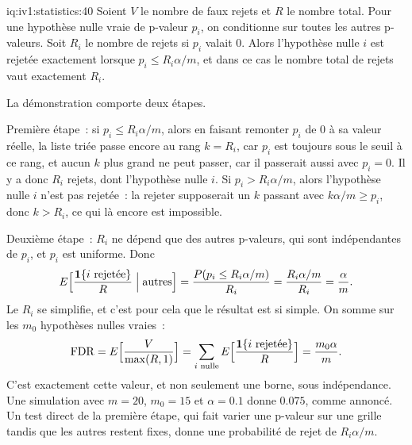 \begin{solution}{iq:iv1:statistics:40}
Soient $V$ le nombre de faux rejets et $R$ le nombre total. Pour une hypothèse nulle vraie de p-valeur $p_i$, on conditionne sur toutes les autres p-valeurs. Soit $R_i$ le nombre de rejets si $p_i$ valait 0. Alors l'hypothèse nulle $i$ est rejetée exactement lorsque $p_i \le R_i\alpha/m$, et dans ce cas le nombre total de rejets vaut exactement $R_i$.

La démonstration comporte deux étapes.

Première étape~: si $p_i \le R_i\alpha/m$, alors en faisant remonter $p_i$ de 0 à sa valeur réelle, la liste triée passe encore au rang $k = R_i$, car $p_i$ est toujours sous le seuil à ce rang, et aucun $k$ plus grand ne peut passer, car il passerait aussi avec $p_i = 0$. Il y a donc $R_i$ rejets, dont l'hypothèse nulle $i$. Si $p_i > R_i\alpha/m$, alors l'hypothèse nulle $i$ n'est pas rejetée~: la rejeter supposerait un $k$ passant avec $k\alpha/m \ge p_i$, donc $k > R_i$, ce qui là encore est impossible.

Deuxième étape~: $R_i$ ne dépend que des autres p-valeurs, qui sont indépendantes de $p_i$, et $p_i$ est uniforme. Donc
\[
E\Bigl[\frac{\mathbf{1}\{i \text{ rejetée}\}}{R} \Bigm| \text{autres}\Bigr] = \frac{P(p_i \le R_i\alpha/m)}{R_i} = \frac{R_i\alpha/m}{R_i} = \frac{\alpha}{m}.
\]
Le $R_i$ se simplifie, et c'est pour cela que le résultat est si simple. On somme sur les $m_0$ hypothèses nulles vraies~:
\[
\mathrm{FDR} = E\Bigl[\frac{V}{\max(R, 1)}\Bigr] = \sum_{i \text{ nulle}} E\Bigl[\frac{\mathbf{1}\{i \text{ rejetée}\}}{R}\Bigr] = \frac{m_0\alpha}{m}.
\]
C'est exactement cette valeur, et non seulement une borne, sous indépendance. Une simulation avec $m = 20$, $m_0 = 15$ et $\alpha = 0.1$ donne $0.075$, comme annoncé. Un test direct de la première étape, qui fait varier une p-valeur sur une grille tandis que les autres restent fixes, donne une probabilité de rejet de $R_i\alpha/m$.

\end{solution}
